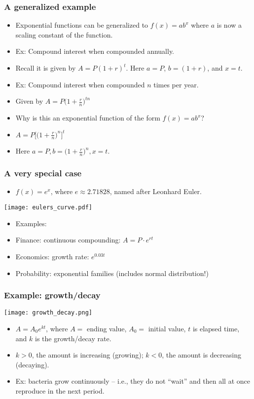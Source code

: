 \documentclass[xcolor=dvipsnames, 9pt]{beamer} %
\begin{document}
\begin{frame}
\frametitle{A generalized example}
\begin{itemize}
\item Exponential functions can be generalized to $f(x) = ab^x$ where $a$ is now a scaling constant of the function. 
\item Ex: Compound interest when compounded annually. 
\item[] Recall it is given by $A = P(1+r)^t$. Here $a = P$, $b = (1+r)$, and $x=t$.
\item Ex: Compound interest when compounded $n$ times per year. 
\item[] Given by $A = P\big( 1 + \frac{r}{n} \big) ^{tn}$
\item Why is this an exponential function of the form $f(x) = ab^x$?
\item[] $A = P \bigg[ \big( 1 + \frac{r}{n} \big) ^{n} \bigg] ^t$
\item[] Here $a = P, b = \big( 1 + \frac{r}{n} \big)^n, x = t$. 
\end{itemize}
\end{frame}

\begin{frame}
\frametitle{A very special case}
\begin{itemize}
\item $f(x) = e^x$, where $e \approx 2.71828$, named after Leonhard Euler. 
\end{itemize}
\begin{center}
\texttt{[image: eulers\_curve.pdf]}
\end{center}
\vspace{-2em}
\begin{itemize}
\item Examples: 
\item Finance: continuous compounding: $A = P \cdot e^{rt}$
\item Economics: growth rate: $e^{0.03t}$
\item Probability: exponential families (includes normal distribution!)
\end{itemize}
\end{frame}

\begin{frame}
\frametitle{Example: growth/decay}

\begin{center}
\texttt{[image: growth\_decay.png]}
\end{center}
\begin{itemize}
    \item $A = A_0e^{kt} $, where $A=$ ending value, $A_0=$ initial value, $t$ is elapsed time, and $k$ is the growth/decay rate. 
    \item $k > 0$, the amount is increasing (growing); $k < 0$, the amount is decreasing (decaying).
    \item Ex: bacteria grow continuously -- i.e., they do not ``wait'' and then all at once reproduce in the next period.
\end{itemize}
\end{frame}
\end{document}
